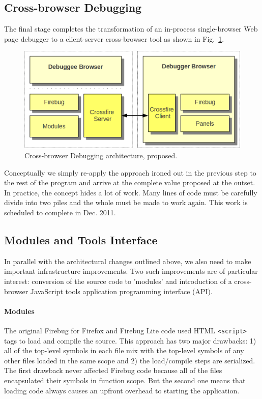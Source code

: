 \subsection{Cross-browser Debugging}
The final stage completes the transformation of an in-process single-browser Web
page debugger to a client-server cross-browser tool as shown in
Fig.~\ref{fig:crossbrowser}. \begin{figure}[htp]
  \includegraphics [width = 86 mm] {figures/crossbrowser}
  \caption{Cross-browser Debugging architecture, proposed.}
 \label{fig:crossbrowser}
\end{figure}
Conceptually we simply re-apply the approach ironed out in the previous step to
the rest of the program and arrive at the complete value proposed at the outset.
In practice, the concept hides a lot of work. Many lines of code must be
carefully divide into two piles and the whole must be made to work again. This
work is scheduled to complete in Dec. 2011.

\subsection{Modules and Tools Interface}
In parallel with the architectural changes outlined above, we also need to make
important infrastructure improvements. Two such improvements are of particular
interest: conversion of the source code to 'modules' and introduction of a
cross-browser JavaScript tools application programming interface (API).


\paragraph{Modules} The original Firebug for Firefox and Firebug Lite code used
HTML \texttt{<script>} tags to load and compile the source. This approach has
two major drawbacks: 1) all of the top-level symbols in each file mix with the
top-level symbols of any other files loaded in the same scope and 2) the
load/compile steps are serialized. The first drawback never affected Firebug
code because all of the files encapsulated their symbols in function scope. But
the second one means that loading code always causes an upfront overhead to
starting the application.


